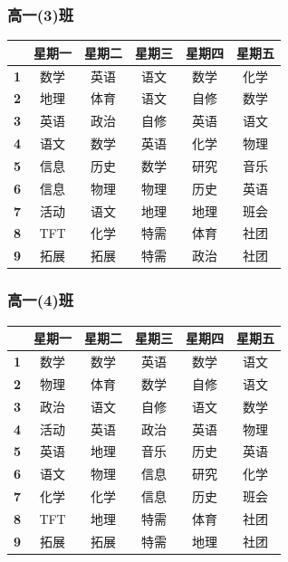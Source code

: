 \documentclass[a4paper]{article}
\begin{document}
  \subsubsection{高一(3)班}
   \begin{tabular}{|c|c|c|c|c|c|}
   \hline
   & \bf 星期一 & \bf 星期二 & \bf 星期三 & \bf 星期四 & \bf 星期五 \\\hline
   \bf 1 & 数学 & 英语 & 语文 & 数学 & 化学 \\\hline
   \bf 2 & 地理 & 体育 & 语文 & 自修 & 数学 \\\hline
   \bf 3 & 英语 & 政治 & 自修 & 英语 & 语文 \\\hline
   \bf 4 & 语文 & 数学 & 英语 & 化学 & 物理 \\\hline
   \bf 5 & 信息 & 历史 & 数学 & 研究 & 音乐 \\\hline
   \bf 6 & 信息 & 物理 & 物理 & 历史 & 英语 \\\hline
   \bf 7 & 活动 & 语文 & 地理 & 地理 & 班会 \\\hline
   \bf 8 & TFT  & 化学 & 特需 & 体育 & 社团 \\\hline
   \bf 9 & 拓展 & 拓展 & 特需 & 政治 & 社团 \\\hline
   \end{tabular}
  \subsubsection{高一(4)班}
   \begin{tabular}{|c|c|c|c|c|c|}
   \hline
   & \bf 星期一 & \bf 星期二 & \bf 星期三 & \bf 星期四 & \bf 星期五 \\\hline
   \bf 1 & 数学 & 数学 & 英语 & 数学 & 语文 \\\hline
   \bf 2 & 物理 & 体育 & 数学 & 自修 & 语文 \\\hline
   \bf 3 & 政治 & 语文 & 自修 & 语文 & 数学 \\\hline
   \bf 4 & 活动 & 英语 & 政治 & 英语 & 物理 \\\hline
   \bf 5 & 英语 & 地理 & 音乐 & 历史 & 英语 \\\hline
   \bf 6 & 语文 & 物理 & 信息 & 研究 & 化学 \\\hline
   \bf 7 & 化学 & 化学 & 信息 & 历史 & 班会 \\\hline
   \bf 8 & TFT  & 地理 & 特需 & 体育 & 社团 \\\hline
   \bf 9 & 拓展 & 拓展 & 特需 & 地理 & 社团 \\\hline
   \end{tabular}
\end{document}
